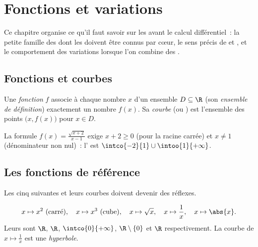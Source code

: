 \chapter{Fonctions et variations}\label{ch:g11:func}

Ce chapitre organise ce qu'il faut savoir sur les  avant le
calcul différentiel~: la petite famille des \emph{}
dont les  doivent être connus par cœur, le sens précis de
\emph{} et \emph{}, et le comportement des
variations lorsque l'on combine des .

\section{Fonctions et courbes}

\begin{definition}\label{def:g11:func:function}
Une \emph{fonction} $f$ associe à chaque nombre $x$ d'un
ensemble $D \subseteq \R$ (son \emph{ensemble de
définition}) exactement un nombre $f(x)$.
Sa \emph{courbe} (ou ) est l'ensemble des points
$\bigl(x, f(x)\bigr)$ pour $x \in D$.
\end{definition}

\begin{example}
La formule $f(x) = \frac{\sqrt{x+2}}{x-1}$ exige $x + 2 \geq 0$ (pour la
racine carrée) et $x \neq 1$ (dénominateur non nul)~: l' est $\intco{-2}{1} \cup \intoo{1}{+\infty}$.
\end{example}

\section{Les fonctions de référence}

Les cinq  suivantes et leurs courbes doivent devenir des
réflexes.

\begin{definition}\label{def:g11:func:reference}
\[
x \mapsto x^2 \text{ (carré)}, \quad
x \mapsto x^3 \text{ (cube)}, \quad
x \mapsto \sqrt{x}, \quad
x \mapsto \frac{1}{x}, \quad
x \mapsto \abs{x}.
\]
Leurs  sont $\R$, $\R$, $\intco{0}{+\infty}$,
$\R \setminus \{0\}$ et $\R$ respectivement. La courbe de
$x \mapsto \frac1x$ est une \emph{hyperbole}.
\end{definition}

